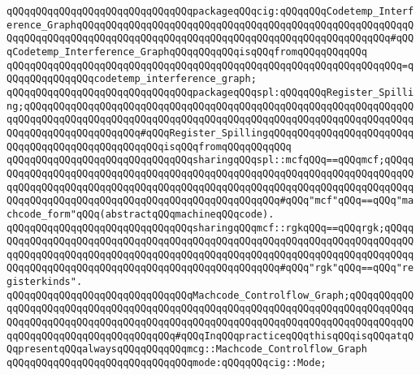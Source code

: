 \newline
\verb|qQQqqQQqqQQqqQQqqQQqqQQqqQQqqQQqpackageqQQqcig:qQQqqQQqCodetemp_Interference_GraphqQQqqQQqqQQqqQQqqQQqqQQqqQQqqQQqqQQqqQQqqQQqqQQqqQQqqQQqqQQqqQQqqQQqqQQqqQQqqQQqqQQqqQQqqQQqqQQqqQQqqQQqqQQqqQQqqQQqqQQqqQQq#qQQqCodetemp_Interference_GraphqQQqqQQqqQQqisqQQqfromqQQqqQQqqQQq|\newline
\verb|qQQqqQQqqQQqqQQqqQQqqQQqqQQqqQQqqQQqqQQqqQQqqQQqqQQqqQQqqQQqqQQqqQQq=qQQqqQQqqQQqqQQqcodetemp_interference_graph;|\newline
\newline
\verb|qQQqqQQqqQQqqQQqqQQqqQQqqQQqqQQqpackageqQQqspl:qQQqqQQqRegister_Spilling;qQQqqQQqqQQqqQQqqQQqqQQqqQQqqQQqqQQqqQQqqQQqqQQqqQQqqQQqqQQqqQQqqQQqqQQqqQQqqQQqqQQqqQQqqQQqqQQqqQQqqQQqqQQqqQQqqQQqqQQqqQQqqQQqqQQqqQQqqQQqqQQqqQQqqQQqqQQqqQQq#qQQqRegister_SpillingqQQqqQQqqQQqqQQqqQQqqQQqqQQqqQQqqQQqqQQqqQQqqQQqqQQqisqQQqfromqQQqqQQqqQQq|\newline
\newline
\verb|qQQqqQQqqQQqqQQqqQQqqQQqqQQqqQQqsharingqQQqspl::mcfqQQq==qQQqmcf;qQQqqQQqqQQqqQQqqQQqqQQqqQQqqQQqqQQqqQQqqQQqqQQqqQQqqQQqqQQqqQQqqQQqqQQqqQQqqQQqqQQqqQQqqQQqqQQqqQQqqQQqqQQqqQQqqQQqqQQqqQQqqQQqqQQqqQQqqQQqqQQqqQQqqQQqqQQqqQQqqQQqqQQqqQQqqQQqqQQqqQQqqQQqqQQq#qQQq"mcf"qQQq==qQQq"machcode_form"qQQq(abstractqQQqmachineqQQqcode).|\newline
\verb|qQQqqQQqqQQqqQQqqQQqqQQqqQQqqQQqsharingqQQqmcf::rgkqQQq==qQQqrgk;qQQqqQQqqQQqqQQqqQQqqQQqqQQqqQQqqQQqqQQqqQQqqQQqqQQqqQQqqQQqqQQqqQQqqQQqqQQqqQQqqQQqqQQqqQQqqQQqqQQqqQQqqQQqqQQqqQQqqQQqqQQqqQQqqQQqqQQqqQQqqQQqqQQqqQQqqQQqqQQqqQQqqQQqqQQqqQQqqQQqqQQqqQQqqQQq#qQQq"rgk"qQQq==qQQq"registerkinds".|\newline
\newline
\verb|qQQqqQQqqQQqqQQqqQQqqQQqqQQqqQQqMachcode_Controlflow_Graph;qQQqqQQqqQQqqQQqqQQqqQQqqQQqqQQqqQQqqQQqqQQqqQQqqQQqqQQqqQQqqQQqqQQqqQQqqQQqqQQqqQQqqQQqqQQqqQQqqQQqqQQqqQQqqQQqqQQqqQQqqQQqqQQqqQQqqQQqqQQqqQQqqQQqqQQqqQQqqQQqqQQqqQQqqQQqqQQqqQQq#qQQqInqQQqpracticeqQQqthisqQQqisqQQqatqQQqpresentqQQqalwaysqQQqqQQqqQQqmcg::Machcode_Controlflow_Graph|\newline
\newline
\verb|qQQqqQQqqQQqqQQqqQQqqQQqqQQqqQQqmode:qQQqqQQqcig::Mode;|\newline
